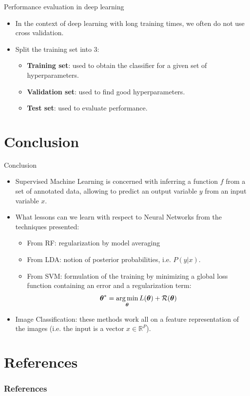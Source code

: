 \documentclass[xcolor=pdftex,dvipsnames,table]{beamer}
\begin{document}
\begin{frame}{Performance evaluation in deep learning}
	\begin{itemize}
		\item In the context of deep learning with long training times, we often do not use cross validation.
		\item Split the training set into 3:
		\begin{itemize}
			\item {\bf Training set}: used to obtain the classifier for a given set of hyperparameters.
			\item {\bf Validation set}: used to find good hyperparameters.
			\item {\bf Test set}: used to evaluate performance. 
		\end{itemize}
	\end{itemize}
\end{frame}


\section{Conclusion}
\begin{frame}{Conclusion}
	\begin{itemize}
		\item Supervised Machine Learning is concerned with inferring a function $f$ from a set of annotated data, allowing to predict an output variable $y$ from an input variable $x$.
		\item What lessons can we learn with respect to Neural Networks from the techniques presented:
		\begin{itemize}
			\item From RF: regularization by model averaging
			\item From LDA: notion of posterior probabilities, i.e. $P(y|x)$.
			\item From SVM: formulation of the training by minimizing a global loss function containing an error and a regularization term: 
			\begin{equation*}
				\boldsymbol{\theta} ^{\ast} = \operatorname*{arg\,min}_{\boldsymbol{\theta}} L (\boldsymbol{\theta}) + \mathcal{R}(\boldsymbol{\theta})
			\end{equation*}
		\end{itemize}
		\item Image Classification: these methods work all on a feature representation of the images (i.e. the input is a vector $x \in \mathbb{R}^P$).
	\end{itemize}
\end{frame}


\section{References}
\begin{frame}[allowframebreaks]
	\frametitle{References}
	
\end{frame}
\end{document}
